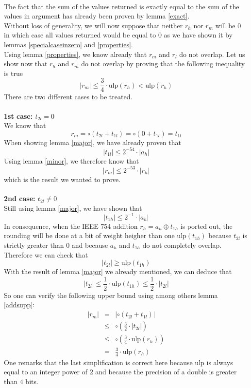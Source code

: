 \documentclass[a4paper,10pt,twoside]{article}
\newenvironment{proof}[1][Proof]{\begin{trivlist}
\item[\hskip \labelsep {\bfseries #1}]}{\end{trivlist}}
\newcommand{\qed}{\nobreak \ifvmode \relax \else \ifdim \lastskip<1.5em \hskip-\lastskip
\hskip1.5em plus0em minus0.5em \fi \nobreak \vrule height0.75em width0.5em depth0.25em\fi}
\newcommand{\hi}{\ensuremath{\mathit{h}}}
\newcommand{\mi}{\ensuremath{\mathit{m}}}
\newcommand{\lo}{\ensuremath{\mathit{l}}}
\newcommand{\mUlp}{\ensuremath{\mathrm{ulp}}}
\begin{document}
\begin{proof} ~ \\
The fact that the sum of the values returned is exactly equal to the sum of
the values in argument has already been proven by lemma \ref{exact}.\\
Without loss of generality, we will now suppose that neither $r_\hi$ nor
$r_\mi$ will be $0$ in which case all values returned would be equal to $0$ 
as we have shown it by lemmas \ref{specialcaseinzero} and \ref{properties}.\\
Using lemma \ref{properties}, we know already that $r_\mi$ and $r_\lo$ do not
overlap. 
Let us show now that $r_\hi$ and $r_\mi$ do not overlap 
by proving that the following inequality is true
$$\left \vert r_\mi \right \vert \leq \frac{3}{4} \cdot \mUlp\left( r_\hi
\right) < \mUlp\left( r_\hi \right)$$ 
There are two different cases to be treated. \\ ~ \\
{\bf 1st case: $t_{2\lo} = 0$} \\
We know that  
$$r_\mi = \circ \left( t_{2\lo} + t_{1\lo} \right) = \circ \left( 0 + t_{1\lo} \right) = t_{1\lo}$$
When showing lemma \ref{major}, we have already proven that
$$\left \vert t_{1\lo} \right \vert \leq 2^{-54} \cdot \left \vert a_\hi \right \vert$$
Using lemma \ref{minor}, we therefore know that
$$\left \vert r_\mi \right \vert \leq 2^{-53} \cdot \left \vert r_\hi \right \vert$$
which is the result we wanted to prove.\\ ~ \\
{\bf 2nd case: $t_{2\lo} \not = 0$} \\
Still using lemma \ref{major}, we have shown that
$$\left \vert t_{1\hi} \right \vert \leq 2^{-1} \cdot \left \vert a_\hi \right \vert$$
In consequence, when the IEEE 754 \cite{IEEE754} addition $r_\hi = a_\hi \oplus t_{1\hi}$ is
ported out, the rounding will be done at a bit of weight heigher than one 
$\mUlp\left(t_{1\hi} \right)$ because $t_{2\lo}$ is strictly greater than $0$
and because $a_\hi$ and $t_{1\hi}$ 
do not completely overlap. Therefore we can check that
$$\left \vert t_{2\lo} \right \vert \geq \mUlp\left( t_{1\hi} \right)$$
With the result of lemma \ref{major} we already mentioned, we can deduce that  
$$\left \vert t_{2\lo} \right \vert \leq \frac{1}{2} \cdot \mUlp\left( t_{1\hi} \right) \leq \frac{1}{2} \cdot \left \vert t_{2\lo} \right \vert$$
So one can verify the following upper bound using among others lemma \ref{addsupp}:
\begin{eqnarray*}
\left \vert r_\mi \right \vert & = & \left \vert \circ \left(t_{2\lo} + t_{1\lo} \right) \right \vert \\
& \leq & \circ \left( \frac{3}{2} \cdot \left \vert t_{2\lo} \right \vert \right) \\
& \leq & \circ \left( \frac{3}{4} \cdot \mUlp \left( r_\hi \right) \right) \\
& = & \frac{3}{4} \cdot \mUlp \left( r_\hi \right)
\end{eqnarray*}
One remarks that the last simplification is correct here because $\mUlp$ is
always equal to an integer power of $2$ and because the precision of a double
is greater than $4$ bits.\qed
\end{proof} 
\end{document}
